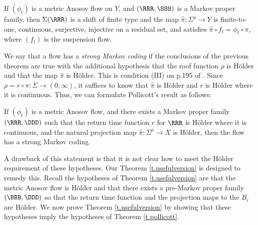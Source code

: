 \begin{thm}
If $(\phi_t)$ is a metric Anosov flow on $Y$, and $(\RRR, \SSS)$ is a Markov proper family, then $\Sigma(\RRR)$ is a shift of finite type and the map $\hat\pi: \Sigma^\rho \to Y$ is finite-to-one, continuous, surjective, injective on a residual set, and satisfies $\hat \pi \circ f_t = \phi_t \circ \hat \pi$, where $(f_t)$ is the suspension flow.
\end{thm}

We say that a flow has a \emph{strong Markov coding} if the conclusions of the previous theorem are true with the additional hypothesis that the roof function $\rho$ is Hölder and that the map $\hat \pi$ is Hölder. This is condition (III) on p.195 of \cite{pollicott}. Since $\rho= r \circ \pi: \Sigma \to (0, \infty)$, it suffices to know that $\hat\pi$ is Hölder and $r$ is Hölder where it is continuous. Thus, we can formulate Pollicott's result as follows:

\begin{thm} [Pollicott] \label{t.pollicott}
If $(\phi_t)$ is a metric Anosov flow, and there exists a Markov proper family $(\RRR, \DDD)$ such that the return time function $r$ for $\RRR$ is Hölder where it is continuous, and the natural projection map $\hat \pi: \Sigma^\rho \to X$ is Hölder, then the flow has a strong Markov coding.
\end{thm}

A drawback of this statement is that it is not clear how to meet the Hölder \hbox{requirement} of these hypotheses. Our Theorem \ref{t.usefulversion} is designed to remedy this. Recall the hypotheses of Theorem \ref{t.usefulversion} are that the metric Anosov flow is Hölder and that there exists a pre-Markov proper family $(\BBB, \DDD)$ so that the return time function and the projection maps to the $B_i$ are Hölder. We now prove Theorem \ref{t.usefulversion} by showing that these hypotheses imply the hypotheses of Theorem \ref{t.pollicott}.

